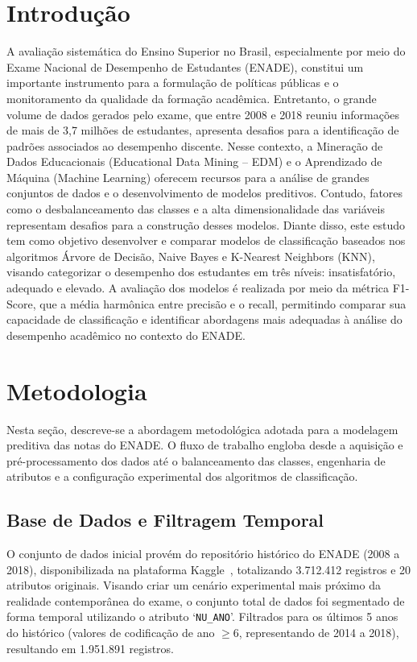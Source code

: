 \documentclass[12pt]{article}
\begin{document}
\section{Introdução}

A avaliação sistemática do Ensino Superior no Brasil, especialmente por meio do Exame Nacional de Desempenho de Estudantes (ENADE), constitui um importante instrumento para a formulação de políticas públicas e o monitoramento da qualidade da formação acadêmica. Entretanto, o grande volume de dados gerados pelo exame, que entre 2008 e 2018 reuniu informações de mais de 3,7 milhões de estudantes, apresenta desafios para a identificação de padrões associados ao desempenho discente. Nesse contexto, a Mineração de Dados Educacionais (Educational Data Mining – EDM) e o Aprendizado de Máquina (Machine Learning) oferecem recursos para a análise de grandes conjuntos de dados e o desenvolvimento de modelos preditivos. Contudo, fatores como o desbalanceamento das classes e a alta dimensionalidade das variáveis representam desafios para a construção desses modelos. Diante disso, este estudo tem como objetivo desenvolver e comparar modelos de classificação baseados nos algoritmos Árvore de Decisão, Naive Bayes e K-Nearest Neighbors (KNN), visando categorizar o desempenho dos estudantes em três níveis: insatisfatório, adequado e elevado. A avaliação dos modelos é realizada por meio da métrica F1-Score, que a média harmônica entre precisão e o recall, permitindo comparar sua capacidade de classificação e identificar abordagens mais adequadas à análise do desempenho acadêmico no contexto do ENADE.

\section{Metodologia} \label{sec:Mmtodologia}

Nesta seção, descreve-se a abordagem metodológica adotada para a modelagem preditiva das notas do ENADE. O fluxo de trabalho engloba desde a aquisição e pré-processamento dos dados até o balanceamento das classes, engenharia de atributos e a configuração experimental dos algoritmos de classificação.

\subsection{Base de Dados e Filtragem Temporal}

O conjunto de dados inicial provém do repositório histórico do ENADE (2008 a 2018), disponibilizada na plataforma Kaggle~\cite{junior_enade_kaggle}, totalizando 3.712.412 registros e 20 atributos originais. Visando criar um cenário experimental mais próximo da realidade contemporânea do exame, o conjunto total de dados foi segmentado de forma temporal utilizando o atributo `\texttt{NU\_ANO}'. Filtrados para os últimos 5 anos do histórico (valores de codificação de ano $\ge 6$, representando de 2014 a 2018), resultando em 1.951.891 registros.
\end{document}
